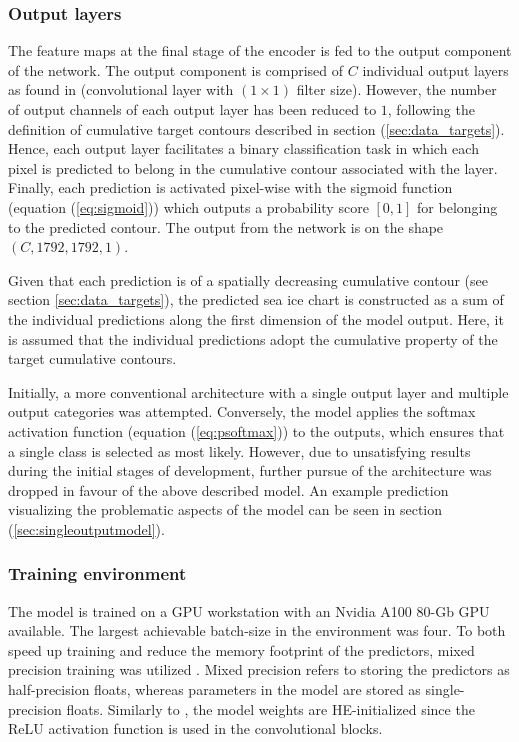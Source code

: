 \documentclass[../main/thesis]{subfiles}
\begin{document}
\subsubsection{Output layers}
\label{sec:architecture-output}
The feature maps at the final stage of the encoder is fed to the output component of the network. The output component is comprised of $C$ individual output layers as found in \citet{Ronneberger2015} (convolutional layer with $(1 \times 1)$ filter size). However, the number of output channels of each output layer has been reduced to $1$, following the definition of cumulative target contours described in section (\ref{sec:data_targets}). Hence, each output layer facilitates a binary classification task in which each pixel is predicted to belong in the cumulative contour associated with the layer. Finally, each prediction is activated pixel-wise with the sigmoid function (equation (\ref{eq:sigmoid})) which outputs a probability score $\left[0, 1\right]$ for belonging to the predicted contour. The output from the network is on the shape $(C, 1792, 1792, 1)$.

Given that each prediction is of a spatially decreasing cumulative contour (see section \ref{sec:data_targets}), the predicted sea ice chart is constructed as a sum of the individual predictions along the first dimension of the model output. Here, it is assumed that the individual predictions adopt the cumulative property of the target cumulative contours. 

Initially, a more conventional architecture with a single output layer and multiple output categories \citep{Ronneberger2015} was attempted. Conversely, the model applies the softmax activation function (equation (\ref{eq:psoftmax})) to the outputs, which ensures that a single class is selected as most likely. However, due to unsatisfying results during the initial stages of development, further pursue of the architecture was dropped in favour of the above described model. An example prediction visualizing the problematic aspects of the model can be seen in section (\ref{sec:singleoutputmodel}). 

\subsubsection{Training environment}
\label{sec:train_env}
The model is trained on a GPU workstation with an Nvidia A100 80-Gb GPU available. The largest achievable batch-size in the environment was four. To both speed up training and reduce the memory footprint of the predictors, mixed precision training was utilized \citep{Micikevicius2017}. Mixed precision refers to storing the predictors as half-precision floats, whereas parameters in the model are stored as single-precision floats. Similarly to \citet{Ronneberger2015}, the model weights are HE-initialized \citep{He2015} since the ReLU activation function \citep{Nair2010} is used in the convolutional blocks.
\end{document}
